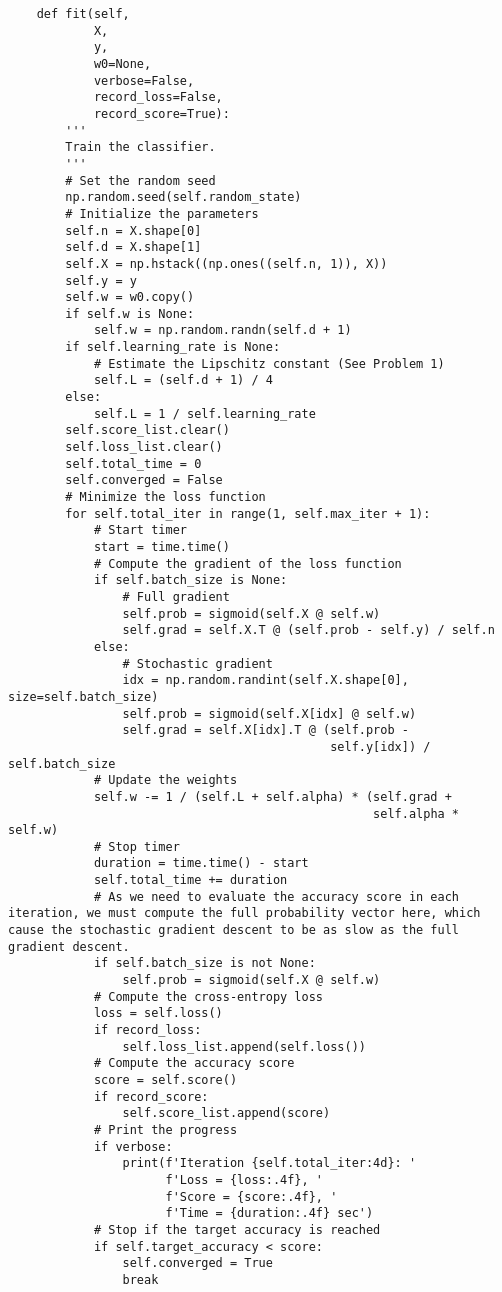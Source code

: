 \begin{verbatim}
    def fit(self,
            X,
            y,
            w0=None,
            verbose=False,
            record_loss=False,
            record_score=True):
        '''
        Train the classifier.
        '''
        # Set the random seed
        np.random.seed(self.random_state)
        # Initialize the parameters
        self.n = X.shape[0]
        self.d = X.shape[1]
        self.X = np.hstack((np.ones((self.n, 1)), X))
        self.y = y
        self.w = w0.copy()
        if self.w is None:
            self.w = np.random.randn(self.d + 1)
        if self.learning_rate is None:
            # Estimate the Lipschitz constant (See Problem 1)
            self.L = (self.d + 1) / 4
        else:
            self.L = 1 / self.learning_rate
        self.score_list.clear()
        self.loss_list.clear()
        self.total_time = 0
        self.converged = False
        # Minimize the loss function
        for self.total_iter in range(1, self.max_iter + 1):
            # Start timer
            start = time.time()
            # Compute the gradient of the loss function
            if self.batch_size is None:
                # Full gradient
                self.prob = sigmoid(self.X @ self.w)
                self.grad = self.X.T @ (self.prob - self.y) / self.n
            else:
                # Stochastic gradient
                idx = np.random.randint(self.X.shape[0], size=self.batch_size)
                self.prob = sigmoid(self.X[idx] @ self.w)
                self.grad = self.X[idx].T @ (self.prob -
                                             self.y[idx]) / self.batch_size
            # Update the weights
            self.w -= 1 / (self.L + self.alpha) * (self.grad +
                                                   self.alpha * self.w)
            # Stop timer
            duration = time.time() - start
            self.total_time += duration
            # As we need to evaluate the accuracy score in each iteration, we must compute the full probability vector here, which cause the stochastic gradient descent to be as slow as the full gradient descent.
            if self.batch_size is not None:
                self.prob = sigmoid(self.X @ self.w)
            # Compute the cross-entropy loss
            loss = self.loss()
            if record_loss:
                self.loss_list.append(self.loss())
            # Compute the accuracy score
            score = self.score()
            if record_score:
                self.score_list.append(score)
            # Print the progress
            if verbose:
                print(f'Iteration {self.total_iter:4d}: '
                      f'Loss = {loss:.4f}, '
                      f'Score = {score:.4f}, '
                      f'Time = {duration:.4f} sec')
            # Stop if the target accuracy is reached
            if self.target_accuracy < score:
                self.converged = True
                break


\end{verbatim}
